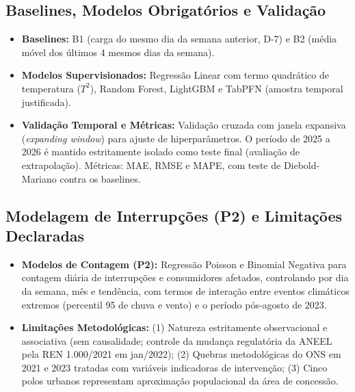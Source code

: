 \documentclass[
  a4paper,
  10pt,
  oneside,
  english,
  brazilian,
]{memoir}
\begin{document}
\subsection*{Baselines, Modelos Obrigatórios e Validação}
\begin{itemize}[leftmargin=12pt, itemsep=-2pt, topsep=1pt]
  \item \textbf{Baselines:} B1 (carga do mesmo dia da semana anterior, D-7) e B2 (média móvel dos últimos 4 mesmos dias da semana).
  \item \textbf{Modelos Supervisionados:} Regressão Linear com termo quadrático de temperatura ($T^2$), Random Forest, LightGBM e TabPFN (amostra temporal justificada).
  \item \textbf{Validação Temporal e Métricas:} Validação cruzada com janela expansiva (\textit{expanding window}) para ajuste de hiperparâmetros. O período de 2025 a 2026 é mantido estritamente isolado como teste final (avaliação de extrapolação). Métricas: MAE, RMSE e MAPE, com teste de Diebold-Mariano contra os baselines.
\end{itemize}

\subsection*{Modelagem de Interrupções (P2) e Limitações Declaradas}
\begin{itemize}[leftmargin=12pt, itemsep=-2pt, topsep=1pt]
  \item \textbf{Modelos de Contagem (P2):} Regressão Poisson e Binomial Negativa para contagem diária de interrupções e consumidores afetados, controlando por dia da semana, mês e tendência, com termos de interação entre eventos climáticos extremos (percentil 95 de chuva e vento) e o período pós-agosto de 2023.
  \item \textbf{Limitações Metodológicas:} (1) Natureza estritamente observacional e associativa (sem causalidade; controle da mudança regulatória da ANEEL pela REN 1.000/2021 em jan/2022); (2) Quebras metodológicas do ONS em 2021 e 2023 tratadas com variáveis indicadoras de intervenção; (3) Cinco polos urbanos representam aproximação populacional da área de concessão.
\end{itemize}
\end{document}
